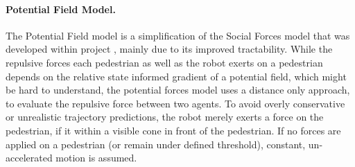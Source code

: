 \paragraph{Potential Field Model.} The Potential Field model is a simplification of the Social Forces model that was developed within project \project, mainly due to its improved tractability. While the repulsive forces each pedestrian as well as the robot exerts on a pedestrian depends on the relative state informed gradient of a potential field, which might be hard to understand, the potential forces model uses a distance only approach, to evaluate the repulsive force between two agents. To avoid overly conservative or unrealistic trajectory predictions, the robot merely exerts a force on the pedestrian, if it within a visible cone in front of the pedestrian. If no forces are applied on a pedestrian (or remain under defined threshold), constant, un-accelerated motion is assumed.
 